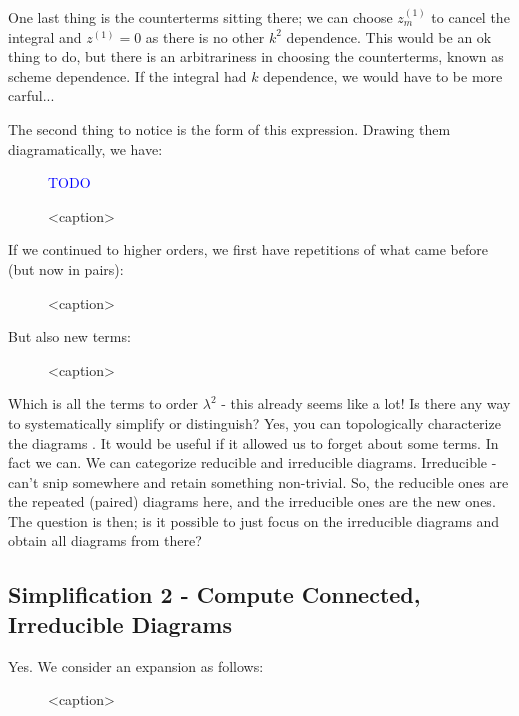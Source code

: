 One last thing is the counterterms sitting there; we can choose $z_m^{(1)}$ to cancel the integral and $z^{(1)} = 0$ as there is no other $k^2$ dependence. This would be an ok thing to do, but there is an arbitrariness in choosing the counterterms, known as scheme dependence. If the integral had $k$ dependence, we would have to be more carful...

The second thing to notice is the form of this expression. Drawing them diagramatically, we have:
\begin{figure}[htbp]
    \centering
    \textcolor{blue}{TODO}
    \caption{<caption>}
    \label{<label>}
\end{figure}

If we continued to higher orders, we first have repetitions of what came before (but now in pairs):

\begin{figure}[htbp]
    \centering
    
    \caption{<caption>}
    \label{<label>}
\end{figure}

But also new terms:

\begin{figure}[htbp]
    \centering
    
    \caption{<caption>}
    \label{<label>}
\end{figure}

Which is all the terms to order $\lambda^2$ - this already seems like a lot! Is there any way to systematically simplify or distinguish? Yes, you can topologically characterize the diagrams . It would be useful if it allowed us to forget about some terms. In fact we can. We can categorize reducible and irreducible diagrams. Irreducible - can't snip somewhere and retain something non-trivial. So, the reducible ones are the repeated (paired) diagrams here, and the irreducible ones are the new ones. The question is then; is it possible to just focus on the irreducible diagrams and obtain all diagrams from there?

\subsection{Simplification 2 - Compute Connected, Irreducible Diagrams}
Yes. We consider an expansion as follows:

\begin{figure}[htbp]
    \centering
    
    \caption{<caption>}
    \label{<label>}
\end{figure}

